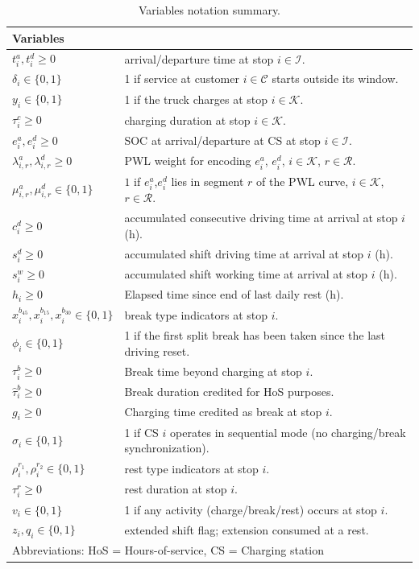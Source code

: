 \begin{table}[h!]
\centering
\caption{Variables notation summary.}
\label{tab:notation-mini2}
\small
\begin{tabular}{p{0.25\linewidth}p{0.75\linewidth}}
\toprule
\multicolumn{2}{l}{\textbf{Variables}}\\
\midrule
$t_i^a,t_i^d \geq 0$ & arrival/departure time at stop $ i \in \mathcal{I}$. \\
$\delta_i \in \{0,1\}$ & 1 if service at customer $ i \in \mathcal{C}$ starts outside its window.\\
$y_i \in \{0,1\}$ & 1 if the truck charges at stop $ i \in \mathcal{K}$.\\
$\tau_i^c \geq 0$ & charging duration at stop $ i \in \mathcal{K}$.\\
$e_i^a, e_i^d \geq 0$ & SOC at arrival/departure at CS at stop $ i \in \mathcal{I}$.\\
$\lambda_{i,r}^{a},\lambda_{i,r}^{d} \geq 0$ & PWL weight for encoding $e_i^a$, $e_i^d$, $i \in \mathcal{K}$, $r \in \mathcal{R}$.\\
$\mu_{i,r}^{a},\mu_{i,r}^{d} \in \{0,1\}$ & $1$ if $e_i^a$,$e_i^d$ lies in segment $r$ of the PWL curve, $i \in \mathcal{K}$, $r \in \mathcal{R}$.\\
$c_i^d \geq 0$ & accumulated consecutive driving time at arrival at stop $i$ (h).\\
$s_i^d \geq 0$ & accumulated shift driving time at arrival at stop $i$ (h).\\
$s_i^w \geq 0$ & accumulated shift working time at arrival at stop $i$ (h).\\
$h_i \geq 0$ & Elapsed time since end of last daily rest (h).\\
$x_i^{b_{45}}, x_i^{b_{15}}, x_i^{b_{30}} \in \{0,1\}$ & break type indicators at stop $i$. \\
$\phi_i \in \{0,1\}$&  1 if the first split break has been taken since the last driving reset.\\
$\tau_i^{b} \geq 0$& Break time beyond charging at stop $i$. \\
$\hat{\tau}_i^{b} \geq 0$& Break duration credited for HoS purposes. \\
$g_i \geq 0$ & Charging time credited as break at stop $i$. \\
$\sigma_i \in \{0,1\}$ & 1 if CS $i$ operates in sequential mode (no charging/break synchronization).\\
$\rho_i^{r_1}, \rho_i^{r_2} \in \{0,1\}$& rest type indicators at stop $i$.\\
$\tau_i^r \geq 0$& rest duration at stop $i$.\\
$v_i \in \{0,1\}$ & 1 if any activity (charge/break/rest) occurs at stop $i$.\\
$z_i, q_i \in \{0,1\}$ & extended shift flag; extension consumed at a rest.\\
\bottomrule
\multicolumn{2}{l}{{\footnotesize Abbreviations: HoS = Hours-of-service, CS = Charging station}}\\
\end{tabular}
\end{table}

